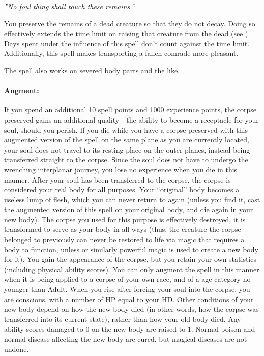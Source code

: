 \emph{''No foul thing shall touch these remains.``}

You preserve the remains of a dead creature so that they do not decay. 
Doing so effectively extends the time limit on raising that creature from the dead (see ). 
Days spent under the influence of this spell don't count against the time limit. 
Additionally, this spell makes transporting a fallen comrade more pleasant.

The spell also works on severed body parts and the like.

\paragraph{Augment:} If you spend an additional 10 spell points and 1000 experience points, the corpse preserved gains an additional quality - the ability to become a receptacle for your soul, should you perish.
If you die while you have a corpse preserved with this augmented version of the spell on the same plane as you are currently located, your soul does not travel to its resting place on the outer planes, instead being transferred straight to the corpse. 
Since the soul does not have to undergo the wrenching interplanar journey, you lose no experience when you die in this manner.
After your soul has been transferred to the corpse, the corpse is considered your real body for all purposes.
Your ``original'' body becomes a useless lump of flesh, which you can never return to again (unless you find it,  cast the augmented version of this spell on your original body, and die again in your new body).
The corpse you used for this purpose is effectively destroyed, it is transformed to serve as your body in all ways (thus, the creature the corpse belonged to previously can never be restored to life via magic that requires a body to function, unless  or similarly powerful magic is used to create a new body for it).
You gain the appearance of the corpse, but you retain your own statistics (including physical ability scores).
You can only augment the spell in this manner when it is being applied to a corpse of your own race, and of a age category no younger than Adult.
When you rise after forcing your soul into the corpse, you are conscious, with a number of HP equal to your HD.
Other conditions of your new body depend on how the new body died (in other words, how the corpse was transferred into its current state), rather than how your old body died.
Any ability scores damaged to 0 on the new body are raised to 1. 
Normal poison and normal disease affecting the new body are cured, but magical diseases are not undone.
